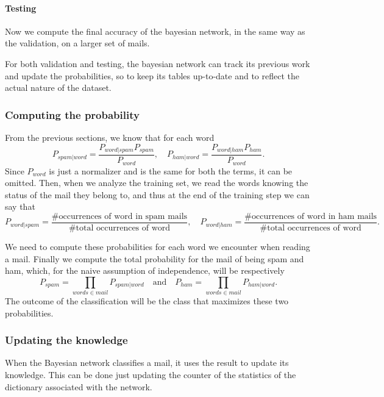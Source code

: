 \paragraph{Testing}
Now we compute the final accuracy of the bayesian network, in the same way as the validation, on a larger set of mails.

For both validation and testing, the bayesian network can track its previous work and update the probabilities, so to keep its tables up-to-date and to reflect the actual nature of the dataset.

\subsubsection{Computing the probability}
\label{computeprob}
From the previous sections, we know that for each word $$P_{spam|word} = \frac{P_{word|spam}P_{spam}}{P_{word}}, \quad P_{ham|word} = \frac{P_{word|ham}P_{ham}}{P_{word}}.$$ Since $P_{word}$ is just a normalizer and is the same for both the terms, it can be omitted. Then, when we analyze the training set, we read the words knowing the status of the mail they belong to, and thus at the end of the training step we can say that $$P_{word|spam} = \frac{\mbox{\# occurrences of word in spam mails}}{\mbox{\# total occurrences of word}}, \quad P_{word|ham} = \frac{\mbox{\# occurrences of word in ham mails}}{\mbox{\# total occurrences of word}}.$$

We need to compute these probabilities for each word we encounter when reading a mail. Finally we compute the total probability for the mail of being spam and ham, which, for the naive assumption of independence, will be respectively $$P_{spam} = \prod_{words \in mail} P_{spam|word} \quad\mbox{and}\quad P_{ham} = \prod_{words \in mail} P_{ham|word}.$$ The outcome of the classification will be the class that maximizes these two probabilities.

\subsubsection{Updating the knowledge}
When the Bayesian network classifies a mail, it uses the result to update its knowledge. This can be done just updating the counter of the statistics of the dictionary associated with the network.
